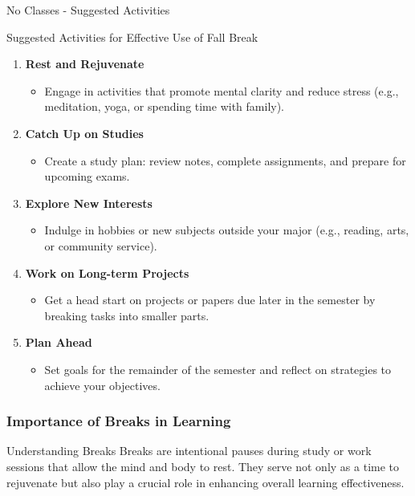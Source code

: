 \documentclass[aspectratio=169]{beamer}
\begin{document}
\begin{frame}[fragile]{No Classes - Suggested Activities}
    \begin{block}{Suggested Activities for Effective Use of Fall Break}
        \begin{enumerate}
            \item \textbf{Rest and Rejuvenate}
            \begin{itemize}
                \item Engage in activities that promote mental clarity and reduce stress (e.g., meditation, yoga, or spending time with family).
            \end{itemize}

            \item \textbf{Catch Up on Studies}
            \begin{itemize}
                \item Create a study plan: review notes, complete assignments, and prepare for upcoming exams.
            \end{itemize}

            \item \textbf{Explore New Interests}
            \begin{itemize}
                \item Indulge in hobbies or new subjects outside your major (e.g., reading, arts, or community service).
            \end{itemize}

            \item \textbf{Work on Long-term Projects}
            \begin{itemize}
                \item Get a head start on projects or papers due later in the semester by breaking tasks into smaller parts.
            \end{itemize}

            \item \textbf{Plan Ahead}
            \begin{itemize}
                \item Set goals for the remainder of the semester and reflect on strategies to achieve your objectives.
            \end{itemize}
        \end{enumerate}
    \end{block}
\end{frame}

\begin{frame}[fragile]
    \frametitle{Importance of Breaks in Learning}
    \begin{block}{Understanding Breaks}
        Breaks are intentional pauses during study or work sessions that allow the mind and body to rest. They serve not only as a time to rejuvenate but also play a crucial role in enhancing overall learning effectiveness.
    \end{block}
\end{frame}
\end{document}

